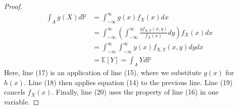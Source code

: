 \documentclass{article}
\newcommand{\p}{\mathbb{P}}
\newcommand{\E}{\mathbb{E}}
\newcommand{\infint}{\int_{-\infty}^{\infty}}
\theoremstyle{definition}
\theoremstyle{definition}
\begin{document}
\begin{enumerate}
\begin{proof}
\begin{align}
    \int_A g(X) d\p  &= \infint g(x)f_X(x)dx     \\
                     &= \infint \left( \infint  \frac{y f_{X,Y}(x,y)}{f_{X}(x)} dy  \right) f_X(x) dx  \\
                     &= \infint \infint y(x) f_{X,Y}(x,y) dy dx \\
                     &= \E[Y] = \int_A Y d\p
\end{align}
Here, line (17) is an application of line (15), where we substitute $g(x)$ for $h(x)$. Line (18) then applies equation (14) to the previous line. Line (19) cancels $f_X(x)$. Finally, line (20) uses the property of line (16) in one variable.
\end{proof}



\end{enumerate}
\end{document}
